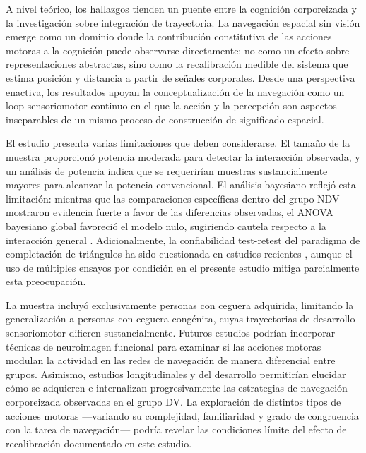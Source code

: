 \documentclass[12pt,letterpaper]{article}
\begin{document}
A nivel teórico, los hallazgos tienden un puente entre la cognición corporeizada y la investigación sobre integración de trayectoria. La navegación espacial sin visión emerge como un dominio donde la contribución constitutiva de las acciones motoras a la cognición puede observarse directamente: no como un efecto sobre representaciones abstractas, sino como la recalibración medible del sistema que estima posición y distancia a partir de señales corporales. Desde una perspectiva enactiva, los resultados apoyan la conceptualización de la navegación como un loop sensoriomotor continuo en el que la acción y la percepción son aspectos inseparables de un mismo proceso de construcción de significado espacial.

El estudio presenta varias limitaciones que deben considerarse. El tamaño de la muestra proporcionó potencia moderada para detectar la interacción observada, y un análisis de potencia indica que se requerirían muestras sustancialmente mayores para alcanzar la potencia convencional. El análisis bayesiano reflejó esta limitación: mientras que las comparaciones específicas dentro del grupo NDV mostraron evidencia fuerte a favor de las diferencias observadas, el ANOVA bayesiano global favoreció el modelo nulo, sugiriendo cautela respecto a la interacción general \parencite{vanDoorn2021}. Adicionalmente, la confiabilidad test-retest del paradigma de completación de triángulos ha sido cuestionada en estudios recientes \parencite{McLaren2022}, aunque el uso de múltiples ensayos por condición en el presente estudio mitiga parcialmente esta preocupación.

La muestra incluyó exclusivamente personas con ceguera adquirida, limitando la generalización a personas con ceguera congénita, cuyas trayectorias de desarrollo sensoriomotor difieren sustancialmente. Futuros estudios podrían incorporar técnicas de neuroimagen funcional para examinar si las acciones motoras modulan la actividad en las redes de navegación de manera diferencial entre grupos. Asimismo, estudios longitudinales y del desarrollo permitirían elucidar cómo se adquieren e internalizan progresivamente las estrategias de navegación corporeizada observadas en el grupo DV. La exploración de distintos tipos de acciones motoras ---variando su complejidad, familiaridad y grado de congruencia con la tarea de navegación--- podría revelar las condiciones límite del efecto de recalibración documentado en este estudio.

\end{document}
